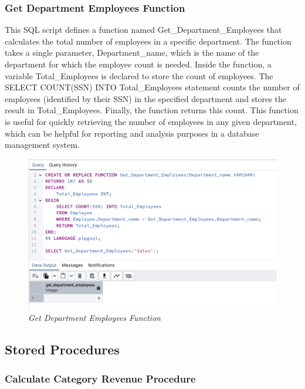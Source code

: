 \subsubsection{Get Department Employees Function}



This SQL script defines a function named Get\_Department\_Employees that calculates the total number of employees in a specific department. The function takes a single parameter, Department\_name, which is the name of the department for which the employee count is needed. Inside the function, a variable Total\_Employees is declared to store the count of employees. The SELECT COUNT(SSN) INTO Total\_Employees statement counts the number of employees (identified by their SSN) in the specified department and stores the result in Total\_Employees. Finally, the function returns this count. This function is useful for quickly retrieving the number of employees in any given department, which can be helpful for reporting and analysis purposes in a database management system.

\begin{figure}[H]
  \centering
  \includegraphics[width=1\textwidth]{images/sql/functions/get_department_employees.png}
  \caption{\textit{Get Department Employees Function}}
\end{figure}

\subsection{Stored Procedures}

\subsubsection{Calculate Category Revenue Procedure}


